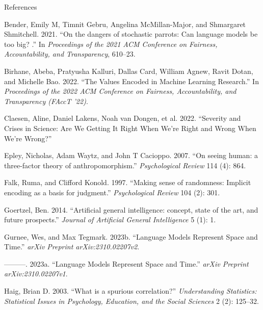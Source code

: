 \documentclass[
  10pt,
  ignorenonframetext,
  aspectratio=169,
  notheorems]{beamer}
\newlength{\cslhangindent}
\newenvironment{CSLReferences}[2] %
 {\begin{list}{}{%
  \setlength{\itemindent}{0pt}
  \setlength{\leftmargin}{0pt}
  \setlength{\parsep}{0pt}
  \ifodd #1
   \setlength{\leftmargin}{\cslhangindent}
   \setlength{\itemindent}{-1\cslhangindent}
  \fi
  \setlength{\itemsep}{#2\baselineskip}}}
 {\end{list}}
\begin{document}
\begin{frame}{References}
\label{references}
\label{refs}
\begin{CSLReferences}{1}{0}
Bender, Emily M, Timnit Gebru, Angelina McMillan-Major, and Shmargaret
Shmitchell. 2021. {``{On the dangers of stochastic parrots: Can language
models be too big?
}.''} In
\emph{Proceedings of the 2021 ACM Conference on Fairness,
Accountability, and Transparency}, 610--23.

Birhane, Abeba, Pratyusha Kalluri, Dallas Card, William Agnew, Ravit
Dotan, and Michelle Bao. 2022. {``{The Values Encoded in Machine
Learning Research}.''} In \emph{Proceedings of the 2022 ACM Conference
on Fairness, Accountability, and Transparency (FAccT '22)}.

Claesen, Aline, Daniel Lakens, Noah van Dongen, et al. 2022.
{``{Severity and Crises in Science: Are We Getting It Right When We're
Right and Wrong When We're Wrong?}''}

Epley, Nicholas, Adam Waytz, and John T Cacioppo. 2007. {``{On seeing
human: a three-factor theory of anthropomorphism.}''}
\emph{Psychological Review} 114 (4): 864.

Falk, Ruma, and Clifford Konold. 1997. {``{Making sense of randomness:
Implicit encoding as a basis for judgment.}''} \emph{Psychological
Review} 104 (2): 301.

Goertzel, Ben. 2014. {``{Artificial general intelligence: concept, state
of the art, and future prospects}.''} \emph{Journal of Artificial
General Intelligence} 5 (1): 1.

Gurnee, Wes, and Max Tegmark. 2023b. {``{Language Models Represent Space
and Time}.''} \emph{arXiv Preprint arXiv:2310.02207v2}.

---------. 2023a. {``Language Models Represent Space and Time.''}
\emph{arXiv Preprint arXiv:2310.02207v1}.

Haig, Brian D. 2003. {``{What is a spurious correlation?}''}
\emph{Understanding Statistics: Statistical Issues in Psychology,
Education, and the Social Sciences} 2 (2): 125--32.


\end{CSLReferences}
\end{frame}
\end{document}
